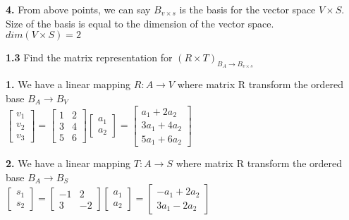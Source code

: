 \documentclass [12pt]{article}
\theoremstyle{definition}
\begin{document}
\phantom{1em} {\bf 4.} From above points, we can say $B_{v \times s}$ is the basis for the vector space $V \times S$.  Size of the basis is  equal to the dimension of the vector space.\\
\phantom{1000em} $dim(V \times S) = 2$

{\bf 1.3} Find the matrix representation for $(R \times T)_{B_{A} \rightarrow B_{v \times s}}$

\phantom{1em} {\bf 1.} We have a linear mapping $R : A \rightarrow V$ where matrix R transform the ordered base $B_{A} \rightarrow B_{V}$ \\
\phantom{1000em} $ \begin{bmatrix} v_{1} \\ v_{2} \\ v_{3} \end{bmatrix} = \begin{bmatrix} 1 & 2 \\ 3 & 4 \\ 5 & 6 \end{bmatrix}  \begin{bmatrix} a_{1} \\ a_{2} \end{bmatrix} =  \begin{bmatrix} a_{1} + 2a_{2}\\ 3a_{1} + 4a_{2} \\ 5a_{1} + 6a_{2} \end{bmatrix}$

\phantom{1em} {\bf 2.} We have a linear mapping $T : A \rightarrow S$ where matrix R transform the ordered base $B_{A} \rightarrow B_{S}$ \\
\phantom{1000em} $ \begin{bmatrix} s_{1} \\ s_{2} \end{bmatrix} = \begin{bmatrix} -1 & 2 \\ 3 & -2 \end{bmatrix}  \begin{bmatrix} a_{1} \\ a_{2} \end{bmatrix} =  \begin{bmatrix} -a_{1} + 2a_{2} \\ 3a_{1} - 2a_{2} \end{bmatrix}$
\end{document}
